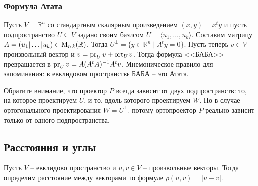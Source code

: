 \subsubsection*{Формула Атата}

Пусть $V = \mathbb R^n$ со стандартным скалярным произведением $(x, y) = x^ty$ и пусть подпространство $U\subseteq V$ задано своим базисом $U = \langle u_1,\ldots,u_k\rangle$.
Составим матрицу $A = (u_1|\ldots|u_k)\in\operatorname{M}_{n\,k}(\mathbb R)$.
Тогда $U^\bot = \{y\in \mathbb R^n \mid A^t y = 0\}$.
Пусть теперь $v\in V$ -- произвольный вектор и $v = \operatorname{pr}_U v + \operatorname{ort}_U v$.
Тогда формула <<БАБА>> превращается в $\operatorname{pr}_U v = A(A^tA)^{-1}A^tv$.
Мнемоническое правило для запоминания: в евклидовом пространстве БАБА -- это Атата.

Обратите внимание, что проектор $P$ всегда зависит от двух подпространств: то, на которое проектируем $U$, и то, вдоль которого проектируем $W$.
Но в случае ортогонального проектирования $W = U^\bot$, потому ортопроектор $P$ реально зависит только от одного подпространства.

\subsection{Расстояния и углы}

\begin{definition}
Пусть $V$ -- евклидово пространство и $u,v\in V$ -- произвольные векторы.
Тогда определим расстояние между векторами по формуле $\rho(u,v) = |u - v|$.
\end{definition}

